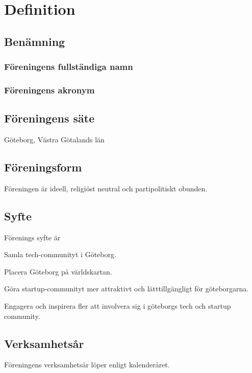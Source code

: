 \section{Definition}

\subsection{Benämning}

\subsubsection{Föreningens fullständiga namn}
\GBGSHFULL{}

\subsubsection{Föreningens akronym}
\GBGSH{}

\subsection{Föreningens säte}
Göteborg, Västra Götalands län

\subsection{Föreningsform}
Föreningen är ideell, religiöst neutral och partipolitiskt obunden.

\subsection{Syfte}
Förenings syfte är
\begin{att}
	\item Samla tech-communityt i Göteborg.
	\item Placera Göteborg på världskartan.
	\item Göra startup-communityt mer attraktivt och lätttillgängligt för göteborgarna.
	\item Engagera och inspirera fler att involvera sig i göteborgs tech och startup community.
\end{att}

\subsection{Verksamhetsår}
Föreningens verksamhetsår löper enligt kalenderåret.
